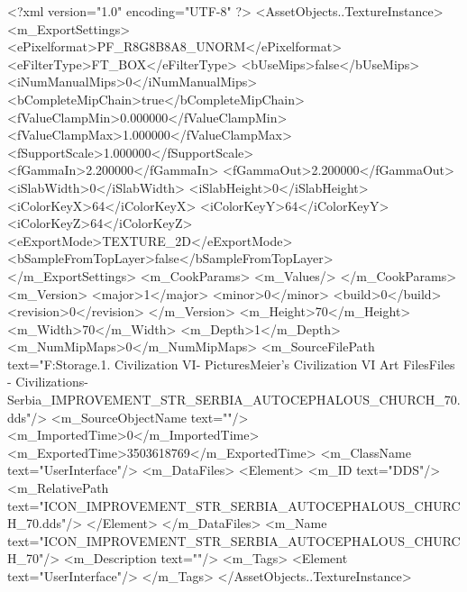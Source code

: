 <?xml version="1.0" encoding="UTF-8" ?>
<AssetObjects..TextureInstance>
	<m_ExportSettings>
		<ePixelformat>PF_R8G8B8A8_UNORM</ePixelformat>
		<eFilterType>FT_BOX</eFilterType>
		<bUseMips>false</bUseMips>
		<iNumManualMips>0</iNumManualMips>
		<bCompleteMipChain>true</bCompleteMipChain>
		<fValueClampMin>0.000000</fValueClampMin>
		<fValueClampMax>1.000000</fValueClampMax>
		<fSupportScale>1.000000</fSupportScale>
		<fGammaIn>2.200000</fGammaIn>
		<fGammaOut>2.200000</fGammaOut>
		<iSlabWidth>0</iSlabWidth>
		<iSlabHeight>0</iSlabHeight>
		<iColorKeyX>64</iColorKeyX>
		<iColorKeyY>64</iColorKeyY>
		<iColorKeyZ>64</iColorKeyZ>
		<eExportMode>TEXTURE_2D</eExportMode>
		<bSampleFromTopLayer>false</bSampleFromTopLayer>
	</m_ExportSettings>
	<m_CookParams>
		<m_Values/>
	</m_CookParams>
	<m_Version>
		<major>1</major>
		<minor>0</minor>
		<build>0</build>
		<revision>0</revision>
	</m_Version>
	<m_Height>70</m_Height>
	<m_Width>70</m_Width>
	<m_Depth>1</m_Depth>
	<m_NumMipMaps>0</m_NumMipMaps>
	<m_SourceFilePath text="F:\Mod Storage\2.1. Civilization VI\Mods\Archive - Pictures\Sid Meier's Civilization VI Art Files\Art Files - Civilizations\Civilization - Serbia\ICON_IMPROVEMENT_STR_SERBIA_AUTOCEPHALOUS_CHURCH_70.dds"/>
	<m_SourceObjectName text=""/>
	<m_ImportedTime>0</m_ImportedTime>
	<m_ExportedTime>3503618769</m_ExportedTime>
	<m_ClassName text="UserInterface"/>
	<m_DataFiles>
		<Element>
			<m_ID text="DDS"/>
			<m_RelativePath text="ICON_IMPROVEMENT_STR_SERBIA_AUTOCEPHALOUS_CHURCH_70.dds"/>
		</Element>
	</m_DataFiles>
	<m_Name text="ICON_IMPROVEMENT_STR_SERBIA_AUTOCEPHALOUS_CHURCH_70"/>
	<m_Description text=""/>
	<m_Tags>
		<Element text="UserInterface"/>
	</m_Tags>
</AssetObjects..TextureInstance>

